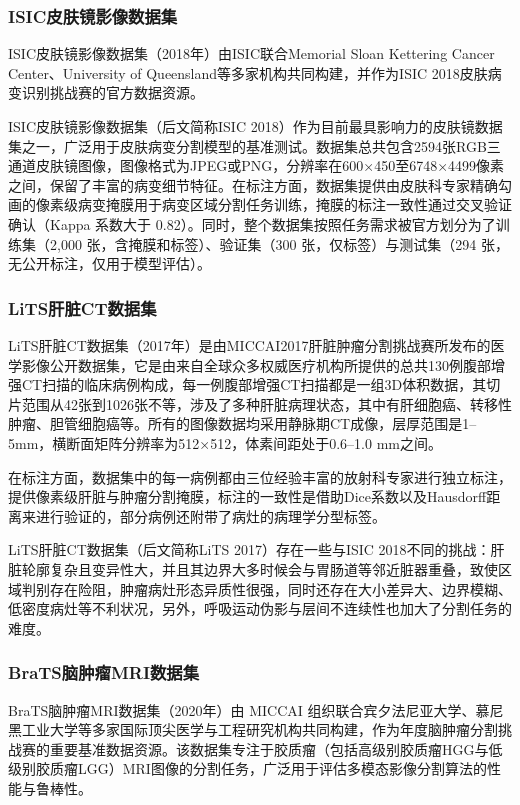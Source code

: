 \subsubsection{ISIC皮肤镜影像数据集}

ISIC皮肤镜影像数据集（2018年）由ISIC联合Memorial Sloan Kettering Cancer Center、University of Queensland等多家机构共同构建，并作为ISIC 2018皮肤病变识别挑战赛的官方数据资源\cite{codella2019skinlesionanalysismelanoma}。

ISIC皮肤镜影像数据集（后文简称ISIC 2018）作为目前最具影响力的皮肤镜数据集之一，广泛用于皮肤病变分割模型的基准测试。数据集总共包含2594张RGB三通道皮肤镜图像，图像格式为JPEG或PNG，分辨率在600×450至6748×4499像素之间，保留了丰富的病变细节特征。在标注方面，数据集提供由皮肤科专家精确勾画的像素级病变掩膜用于病变区域分割任务训练，掩膜的标注一致性通过交叉验证确认（Kappa 系数大于 0.82）。同时，整个数据集按照任务需求被官方划分为了训练集（2,000 张，含掩膜和标签）、验证集（300 张，仅标签）与测试集（294 张，无公开标注，仅用于模型评估）。

\subsubsection{LiTS肝脏CT数据集}

LiTS肝脏CT数据集（2017年）是由MICCAI2017肝脏肿瘤分割挑战赛所发布的医学影像公开数据集，它是由来自全球众多权威医疗机构所提供的总共130例腹部增强CT扫描的临床病例构成，每一例腹部增强CT扫描都是一组3D体积数据，其切片范围从42张到1026张不等，涉及了多种肝脏病理状态，其中有肝细胞癌、转移性肿瘤、胆管细胞癌等\cite{Bilic_2023}。所有的图像数据均采用静脉期CT成像，层厚范围是1–5mm，横断面矩阵分辨率为512×512，体素间距处于0.6–1.0 mm之间。

在标注方面，数据集中的每一病例都由三位经验丰富的放射科专家进行独立标注，提供像素级肝脏与肿瘤分割掩膜，标注的一致性是借助Dice系数以及Hausdorff距离来进行验证的，部分病例还附带了病灶的病理学分型标签。

LiTS肝脏CT数据集（后文简称LiTS 2017）存在一些与ISIC 2018不同的挑战：肝脏轮廓复杂且变异性大，并且其边界大多时候会与胃肠道等邻近脏器重叠，致使区域判别存在险阻，肿瘤病灶形态异质性很强，同时还存在大小差异大、边界模糊、低密度病灶等不利状况，另外，呼吸运动伪影与层间不连续性也加大了分割任务的难度。

\subsubsection{BraTS脑肿瘤MRI数据集}

BraTS脑肿瘤MRI数据集（2020年）由 MICCAI 组织联合宾夕法尼亚大学、慕尼黑工业大学等多家国际顶尖医学与工程研究机构共同构建，作为年度脑肿瘤分割挑战赛的重要基准数据资源\cite{menze2015}。该数据集专注于胶质瘤（包括高级别胶质瘤HGG与低级别胶质瘤LGG）MRI图像的分割任务，广泛用于评估多模态影像分割算法的性能与鲁棒性。

